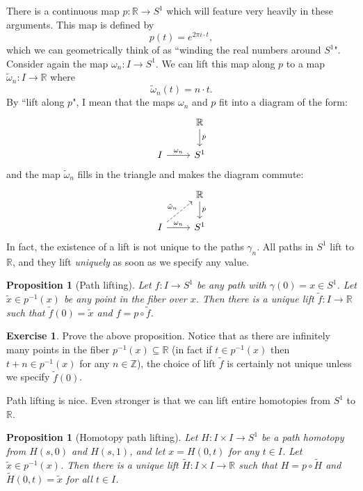 \documentclass[10pt]{amsart}
\newtheorem{proposition}[thm]{Proposition}
\theoremstyle{definition}
\newtheorem{exercise}[thm]{Exercise}
\newcommand{\cdef}[1]{\textcolor{Bittersweet}{#1}}
\begin{document}
There is a continuous map $p:\mathbb{R} \to S^1$ which will feature very heavily in these arguments.
This map is defined by 
\[
p(t) = e^{2\pi i \cdot t},
\]
which we can geometrically think of as ``winding the real numbers around $S^1$". 
Consider again the map $\omega_n:I \to S^1$. 
We can \cdef{lift} this map along $p$ to a map $\tilde{\omega}_n:I \to \mathbb{R}$ where 
\[
\tilde{\omega}_n(t) = n \cdot t.
\]
By ``lift along $p$", I mean that the maps $\omega_n$ and $p$ fit into a diagram of the form:
\[\begin{tikzcd}
	& {\mathbb{R}} \\
	I & {S^1}
	\arrow["p", from=1-2, to=2-2]
	\arrow["{\omega_n}", from=2-1, to=2-2]
\end{tikzcd}\]
and the map $\tilde{\omega}_n$ fills in the triangle and makes the diagram commute:
\[
\begin{tikzcd}
	& {\mathbb{R}} \\
	I & {S^1}
	\arrow["p", from=1-2, to=2-2]
	\arrow["{\tilde{\omega}_n}", dashed, from=2-1, to=1-2]
	\arrow["{\omega_n}", from=2-1, to=2-2]
\end{tikzcd}
\]
In fact, the existence of a lift is not unique to the paths $\gamma_n$. 
All paths in $S^1$ lift to $\mathbb{R}$, and they lift \emph{uniquely} as soon as we specify any value.

\begin{proposition}[\cdef{Path lifting}]
    Let $f:I \to S^1$ be any path with $\gamma(0) = x \in S^1$.
    Let $\tilde{x} \in p^{-1}(x)$ be any point in the fiber over $x$.
    Then there is a unique lift $\tilde{f}:I \to \mathbb{R}$ such that $\tilde{f}(0) = \tilde{x}$ and $f = p \circ \tilde{f}$.
\end{proposition}

\begin{exercise}
    Prove the above proposition. 
    Notice that as there are infinitely many points in the fiber $p^{-1}(x) \subseteq \mathbb{R}$ (in fact if $t \in p^{-1}(x)$ then $t+n \in p^{-1}(x)$ for any $n \in \mathbb{Z}$), the choice of lift $\tilde{f}$ is certainly not unique unless we specify $\tilde{f}(0)$.
\end{exercise}

Path lifting is nice. Even stronger is that we can lift entire homotopies from $S^1$ to $\mathbb{R}$.

\begin{proposition}[\cdef{Homotopy path lifting}]
    Let $H:I \times I \to S^1$ be a path homotopy from $H(s, 0)$ and $H(s,1)$, and let $x = H(0, t)$ for any $t \in I$.
    Let $\tilde{x} \in p^{-1}(x)$.
    Then there is a unique lift $\tilde{H}:I \times I \to \mathbb{R}$ such that $H = p \circ \tilde{H}$ and $\tilde{H}(0, t) = \tilde{x}$ for all $t \in I$.
\end{proposition}
\end{document}
